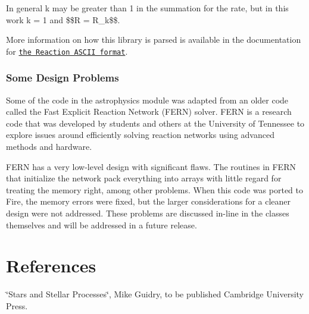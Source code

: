 In general k may be greater than 1 in the summation for the rate, but in this work k = 1 and \$\$R = R\+\_\+k\$\$.

More information on how this library is parsed is available in the documentation for \href{{{ site.baseurl }}{%

\subsubsection*{Some Design Problems}

Some of the code in the astrophysics module was adapted from an older code called the Fast Explicit Reaction Network (F\+E\+RN) solver. F\+E\+RN is a research code that was developed by students and others at the University of Tennessee to explore issues around efficiently solving reaction networks using advanced methods and hardware.

F\+E\+RN has a very low-\/level design with significant flaws. The routines in F\+E\+RN that initialize the network pack everything into arrays with little regard for treating the memory right, among other problems. When this code was ported to Fire, the memory errors were fixed, but the larger considerations for a cleaner design were not addressed. These problems are discussed in-\/line in the classes themselves and will be addressed in a future release.

\section*{References}

\char`\"{}\+Stars and Stellar Processes\char`\"{}, Mike Guidry, to be published Cambridge University Press. 